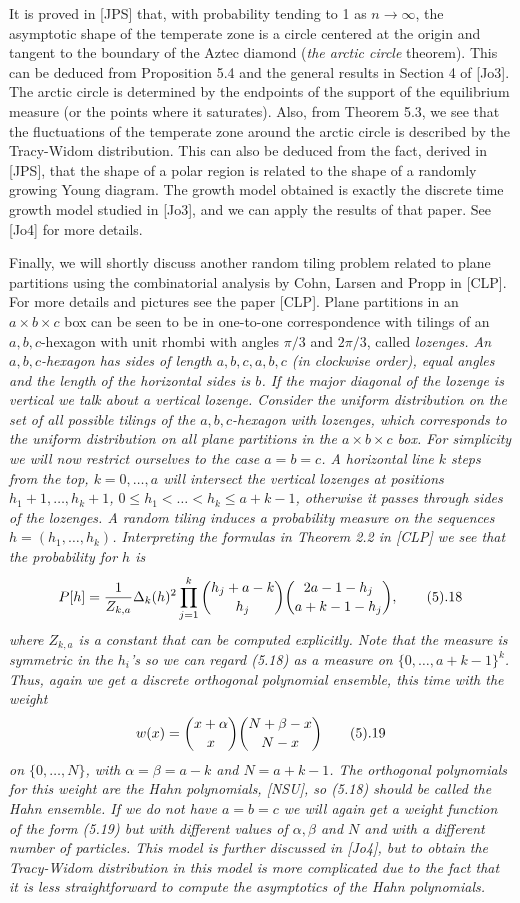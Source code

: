 It is proved in [JPS] that, with probability tending to 1 as
$n\to\infty$, the asymptotic shape of the temperate zone is a circle
centered at the origin and tangent to the boundary of the Aztec
diamond ({\it the arctic circle} theorem). This can be deduced from
Proposition 5.4 and the general results in Section 4 of [Jo3]. The
arctic circle is determined by the endpoints of the support of the
equilibrium measure (or the points where it saturates). Also, from
Theorem 5.3, we see that the fluctuations of the temperate zone around
the arctic circle is described by the Tracy-Widom distribution. This
can also be deduced from the fact, derived in [JPS], that the shape of
a polar region is related to the shape of a randomly growing Young
diagram. The growth model obtained is exactly the discrete time growth
model studied in [Jo3], and we can apply the results of that
paper. See [Jo4] for more details.

Finally, we will shortly discuss another random tiling problem related
to plane partitions using the combinatorial analysis by Cohn, Larsen and
Propp in [CLP]. For more details and pictures see the paper [CLP]. 
Plane partitions in an $a\times b\times c$ box can be seen to be in 
one-to-one correspondence with tilings of an $a,b,c$-hexagon with unit
rhombi with angles $\pi/3$ and $2\pi/3$, called \it lozenges\rm. An
$a,b,c$-hexagon has sides of length $a,b,c,a,b,c$ (in clockwise order), equal angles and
the length of the horizontal sides is $b$. If the major diagonal of the 
lozenge is vertical we talk about a \it vertical lozenge\rm. Consider
the uniform distribution on the set of all possible tilings of the 
$a,b,c$-hexagon with lozenges, which corresponds to the uniform
distribution on all plane partitions in the $a\times b\times c$ box. 
For simplicity we will now restrict ourselves to the case $a=b=c$. A 
horizontal line $k$ steps from the top, $k=0,\dots,a$ will intersect the 
vertical lozenges at positions $h_1+1,\dots, h_k +1$,
$0\le h_1<\dots<h_k\le a+k-1$, otherwise it passes through sides of the 
lozenges. A random tiling induces a probability measure on the sequences
$h=(h_1,\dots,h_k)$. Interpreting the formulas in Theorem 2.2 in [CLP]
we see that the probability for $h$ is
$$
P[h]=\frac 1{Z_{k,a}}\Delta_k(h)^2\prod_{j=1}^k\binom{h_j+a-k}{h_j}
\binom{2a-1-h_j}{a+k-1-h_j},\tag 5.18
$$
where $Z_{k,a}$ is a constant that can be computed explicitly. Note that the 
measure is symmetric in the $h_i$'s so we can regard (5.18) as a measure on 
$\{0,\dots,a+k-1\}^k$. Thus, again we get a discrete orthogonal polynomial
ensemble, this time with the weight
$$
w(x)=\binom{x+\alpha}{x}\binom{N+\beta-x}{N-x}\tag 5.19
$$
on $\{0,\dots,N\}$, with $\alpha=\beta=a-k$ and $N=a+k-1$. The orthogonal
polynomials for this weight are the Hahn polynomials, [NSU], so (5.18) 
should be called the \it Hahn ensemble\rm. If we do not have $a=b=c$
we will again get a weight function of the form (5.19) but with
different values of $\alpha,\beta$ and $N$ and with a different number
of particles. 
This model is further discussed in [Jo4], but to obtain the
Tracy-Widom distribution in this model is more complicated due to the
fact that it is less straightforward to compute the asymptotics of the
Hahn polynomials.

